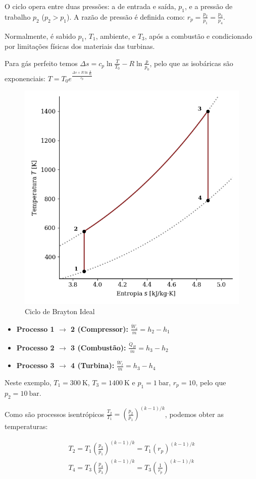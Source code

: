 O ciclo opera entre duas pressões: a de entrada e saída, $p_1$, e a pressão de trabalho $p_2$ ($p_2 > p_1$). A razão de pressão é definida como: $r_p = \frac{p_2}{p_1} = \frac{p_3}{p_4}$.

Normalmente, é sabido $p_1$, $T_1$, ambiente, e $T_3$, após a combustão e condicionado por limitações físicas dos materiais das turbinas.

Para gás perfeito temos $\Delta s = c_p \ln \frac{T}{T_0} - R \ln \frac{p}{p_0}$, pelo que as isobáricas são exponenciais: $T = T_0 e^{\frac{\Delta s + R \ln \frac{p}{p_0}}{c_p}}$

\begin{figure}[H]
    \centering
    \includegraphics[width=0.45\linewidth]{graphs/brayton-Ts-ideal.png}
    \caption{Ciclo de Brayton Ideal}
    \label{fig:brayton-Ts-ideal}
\end{figure}

\begin{itemize}
    \item \textbf{Processo 1 $\rightarrow$ 2 (Compressor):} $\frac{\dot{W}_c}{\dot{m}} = h_2 - h_1$
    \item \textbf{Processo 2 $\rightarrow$ 3 (Combustão):} $\frac{\dot{Q}_H}{\dot{m}} = h_3 - h_2$
    \item \textbf{Processo 3 $\rightarrow$ 4 (Turbina):} $\frac{\dot{W}_t}{\dot{m}} = h_3 - h_4$
\end{itemize}

Neste exemplo, $T_1 = 300~\text{K}$, $T_3 = 1400~\text{K}$ e $p_1 = 1~\text{bar}$, $r_p = 10$, pelo que $p_2 = 10~\text{bar}$.

Como são processos isentrópicos $\frac{T_2}{T_1} = \left( \frac{p_2}{p_1} \right)^{(k-1)/k}$, podemos obter as temperaturas:

\begin{eqnarray}
    T_2 = T_1 \left( \frac{p_2}{p_1} \right)^{(k-1)/k} = T_1 \left( r_p \right)^{(k-1)/k} \\
    T_4 = T_3 \left( \frac{p_4}{p_3} \right)^{(k-1)/k} = T_3 \left( \frac{1}{r_p} \right)^{(k-1)/k}
\end{eqnarray}

